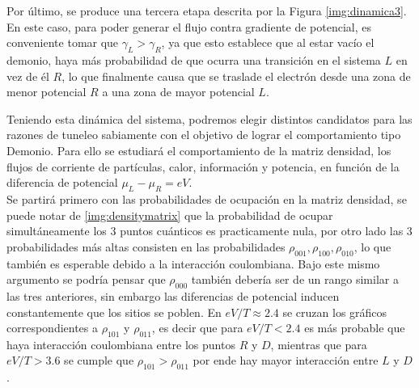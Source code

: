 Por último, se produce una tercera etapa descrita por la Figura \ref{img:dinamica3}. En este caso, para poder generar el flujo contra gradiente de potencial, es conveniente tomar que $\gamma_{L}>\gamma_{R}$, ya que esto establece que al estar vacío el demonio, haya más probabilidad de que ocurra una transición en el sistema $L$ en vez de él $R$, lo que finalmente causa que se traslade el electrón desde una zona de menor potencial $R$ a una zona de mayor potencial $L$.


Teniendo esta dinámica del sistema, podremos elegir distintos candidatos para las razones de tuneleo sabiamente con el objetivo de lograr el comportamiento tipo Demonio. Para ello se estudiará el comportamiento de la matriz densidad, los flujos de corriente de partículas, calor, información y potencia, en función de la diferencia de potencial $\mu_{L}-\mu_{R}=eV$. \\
Se partirá primero con las probabilidades de ocupación en la matriz densidad, se puede notar de \ref{img:densitymatrix} que la probabilidad de ocupar simultáneamente los 3 puntos cuánticos es practicamente nula, por otro lado las 3 probabilidades más altas consisten en las probabilidades $\rho_{001},\rho_{100},\rho_{010}$, lo que también es esperable debido a la interacción coulombiana. Bajo este mismo argumento se podría pensar que $\rho_{000}$ también debería ser de un rango similar a las tres anteriores, sin embargo las diferencias de potencial inducen constantemente que los sitios se poblen. En $eV/T \approx 2.4$ se cruzan los gráficos correspondientes a $\rho_{101}$ y $\rho_{011}$, es decir que para $eV/T<2.4$ es más probable que haya interacción coulombiana entre los puntos $R$ y $D$, mientras que para $eV/T>3.6$ se cumple que $\rho_{101}>\rho_{011}$ por ende hay mayor interacción entre $L$ y $D$.



